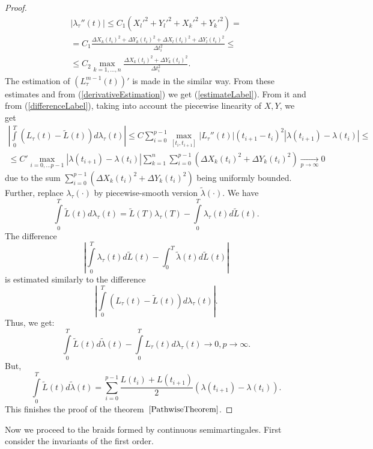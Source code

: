 \documentclass[12pt, a4paper, titlepage]{article}
\begin{document}
\begin{proof}
\begin{multline*}
 |\lambda_{\tau}''(t)|\le C_1 (X_l'^2+Y_l'^2+X_k'^2+Y_k'^2)=\\=
C_1 \frac{\Delta X_k(t_i)^2+\Delta Y_k(t_i)^2 + \Delta X_l(t_i)^2 + \Delta Y_l(t_i)^2}{\Delta t_i^2}
\le \\ \le 
C_2 \max_{k=1,\dots, n}\frac{\Delta X_k(t_i)^2+\Delta Y_k(t_i)^2}{\Delta t_i^2}.
\end{multline*}
 The estimation of $(L_{\tau}^{m-1}(t))'$ is made in the similar way.  
From these estimates and from (\ref{derivativeEstimation}) we get (\ref{estimateLabel}).
From it and from (\ref{differenceLabel}), taking into account the piecewise linearity 
of $X,Y$, we get 
\begin{multline*}
\left|\int\limits_{0}^T (L_{\tau}(t)-\tilde{L}(t))d\lambda_{\tau}(t)\right| \le
C\sum\limits_{i=0}^{p-1}\max_{[t_i,t_{i+1}]}|L_{\tau}''(t)|(t_{i+1}-t_i)^2|\lambda(t_{i+1})-\lambda(t_i)|
\le \\ \le 
C' \max_{i=0,\dots p-1} |\lambda(t_{i+1})-\lambda(t_i)|
\sum\limits_{k=1}^{n} \sum_{i=0}^{p-1}(\Delta X_k(t_i)^2 +\Delta Y_k(t_i)^2)\xrightarrow[p\to\infty]{}0
\end{multline*}
due to the sum $\sum_{i=0}^{p-1}(\Delta X_k(t_i)^2 +\Delta Y_k(t_i)^2)$
being uniformly bounded. 
 Further, replace $\lambda_{\tau}(\cdot)$ by piecewise-smooth version $\tilde{\lambda}(\cdot)$. 
We have
$$\int\limits_0^T \tilde{L}(t) d\lambda_{\tau}(t)=
\tilde{L}(T)\lambda_{\tau}(T)-\int\limits_0^T \lambda_{\tau}(t) d\tilde{L}(t).$$
The difference
$$\left|\int\limits_0^T \lambda_{\tau}(t) d\tilde{L}(t)-\int_0^T \tilde{\lambda}(t) d\tilde{L}(t)\right|$$
is estimated similarly to the difference
$$\left|\int\limits_{0}^T (L_{\tau}(t)-\tilde{L}(t))d\lambda_{\tau}(t)\right|.$$
 Thus, we get:
\begin{equation}\nonumber
\int\limits_0^T \tilde{L}(t)d\tilde{\lambda}(t) - \int\limits_0^T L_{\tau}(t)d\lambda_{\tau}(t) \to 0, p \to \infty.
\end{equation}
But,
\begin{equation}\nonumber
 \int\limits_0^T \tilde{L}(t)d\tilde{\lambda}(t) = \sum\limits_{i=0}^{p-1}\frac{L(t_i)+L(t_{i+1})}2 (\lambda(t_{i+1})-\lambda(t_i)).
\end{equation}
This finishes the proof of the theorem~$\ref{PathwiseTheorem}$.
\end{proof}

Now we proceed to the braids formed by continuous semimartingales. First consider
the invariants of the first order. 
\end{document}
